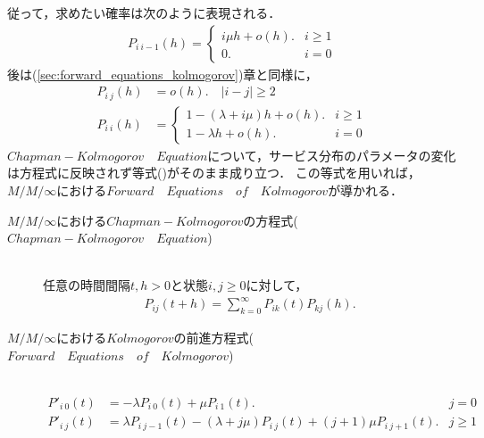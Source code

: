 \documentclass[a4j,papersize,disablejfam,slide,14pt]{jsarticle}
\begin{document}
    従って，求めたい確率は次のように表現される．
    \begin{align}
        P_{i\ i-1}(h) =
        \begin{cases}
        	i \mu h + o(h). & i \geq 1 \\
            0. & i = 0
        \end{cases}
    \end{align}
    後は(\ref{sec:forward_equations_kolmogorov})章と同様に，
    \begin{align}
    	P_{i\ j}(h) &= o(h).\quad |i - j| \geq 2\\
        P_{i\ i}(h) &=
        \begin{cases}
        	1 - (\lambda + i \mu) h + o(h). & i \geq 1 \\
            1 - \lambda h + o(h). & i = 0
        \end{cases}
    \end{align}
    $Chapman-Kolmogorov\quad Equation$について，サービス分布のパラメータの変化は方程式に反映されず等式()がそのまま成り立つ．
    この等式を用いれば，$M/M/\infty$における$Forward\quad Equations\quad of\quad Kolmogorov$が導かれる．
    \begin{screen}
    	\begin{description}
        	\item[$M/M/\infty$における$Chapman-Kolmogorov$の方程式($Chapman-Kolmogorov\quad Equation$)]\mbox{}\\
            	任意の時間間隔$t,h > 0$と状態$i,j \geq 0$に対して，
                \begin{align}
            		P_{ij}(t+h) = \sum_{k=0}^{\infty} P_{ik}(t)P_{kj}(h).
                \end{align}
            
        	\item[$M/M/\infty$における$Kolmogorov$の前進方程式($Forward\quad Equations\quad of\quad Kolmogorov$)]\mbox{}\\
    			\begin{align}
    				P'_{i\ 0}(t) &= -\lambda P_{i\ 0}(t) + \mu P_{i\ 1}(t). & j = 0\\
                    P'_{i\ j}(t) &= \lambda P_{i\ j-1}(t) - (\lambda + j\mu) P_{i\ j}(t) + (j+1)\mu P_{i\ j+1}(t). & j \geq 1\\
        		\end{align}
        \end{description}
    \end{screen}
\end{document}
